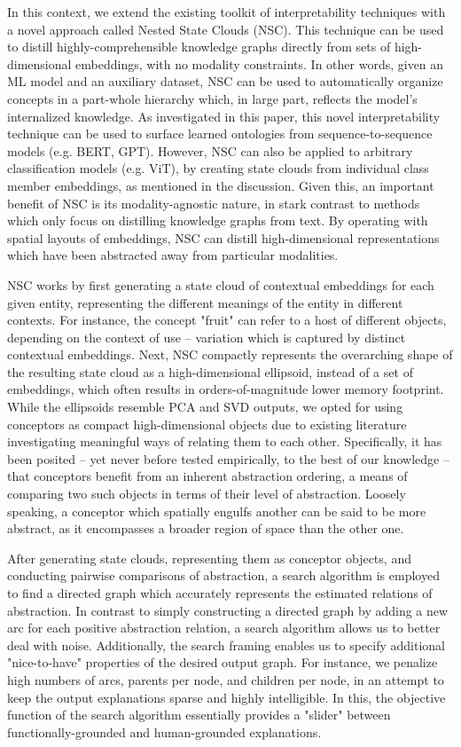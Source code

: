 In this context, we extend the existing toolkit of interpretability techniques with a novel approach called Nested State Clouds (NSC). This technique can be used to distill highly-comprehensible knowledge graphs directly from sets of high-dimensional embeddings, with no modality constraints. In other words, given an ML model and an auxiliary dataset, NSC can be used to automatically organize concepts in a part-whole hierarchy which, in large part, reflects the model's internalized knowledge. As investigated in this paper, this novel interpretability technique can be used to surface learned ontologies from sequence-to-sequence models (e.g. BERT, GPT). However, NSC can also be applied to arbitrary classification models (e.g. ViT), by creating state clouds from individual class member embeddings, as mentioned in the discussion. Given this, an important benefit of NSC is its modality-agnostic nature, in stark contrast to methods which only focus on distilling knowledge graphs from text. By operating with spatial layouts of embeddings, NSC can distill high-dimensional representations which have been abstracted away from particular modalities.

NSC works by first generating a state cloud of contextual embeddings for each given entity, representing the different meanings of the entity in different contexts. For instance, the concept "fruit" can refer to a host of different objects, depending on the context of use -- variation which is captured by distinct contextual embeddings. Next, NSC compactly represents the overarching shape of the resulting state cloud as a high-dimensional ellipsoid, instead of a set of embeddings, which often results in orders-of-magnitude lower memory footprint. While the ellipsoids resemble PCA and SVD outputs, we opted for using conceptors as compact high-dimensional objects due to existing literature investigating meaningful ways of relating them to each other. Specifically, it has been posited -- yet never before tested empirically, to the best of our knowledge -- that conceptors benefit from an inherent abstraction ordering, a means of comparing two such objects in terms of their level of abstraction. Loosely speaking, a conceptor which spatially engulfs another can be said to be more abstract, as it encompasses a broader region of space than the other one.

After generating state clouds, representing them as conceptor objects, and conducting pairwise comparisons of abstraction, a search algorithm is employed to find a directed graph which accurately represents the estimated relations of abstraction. In contrast to simply constructing a directed graph by adding a new arc for each positive abstraction relation, a search algorithm allows us to better deal with noise. Additionally, the search framing enables us to specify additional "nice-to-have" properties of the desired output graph. For instance, we penalize high numbers of arcs, parents per node, and children per node, in an attempt to keep the output explanations sparse and highly intelligible. In this, the objective function of the search algorithm essentially provides a "slider" between functionally-grounded and human-grounded explanations.

